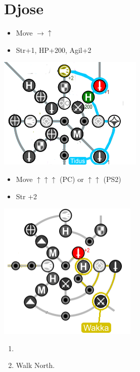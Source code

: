 \chapter{Djose}

\begin{spheregrid}
  \begin{itemize}
    \tidusf
    \begin{itemize}
      \item Move $\rightarrow\uparrow$
      \item Str+1, HP+200, Agil+2
    \end{itemize}
    \includegraphics[width=.6\columnwidth]{graphics/Tidus_post_gui}
    \wakkaf
    \begin{itemize}
      \item Move $\uparrow\uparrow\uparrow$ (PC) or $\uparrow\uparrow$ (PS2)
      \item Str +2
    \end{itemize}
    \includegraphics{graphics/djosewakka}
  \end{itemize}
\end{spheregrid}
\begin{enumerate}
  \item \formation{\tidus}{\yuna}{\auron}
  \item Walk North.
\end{enumerate}
